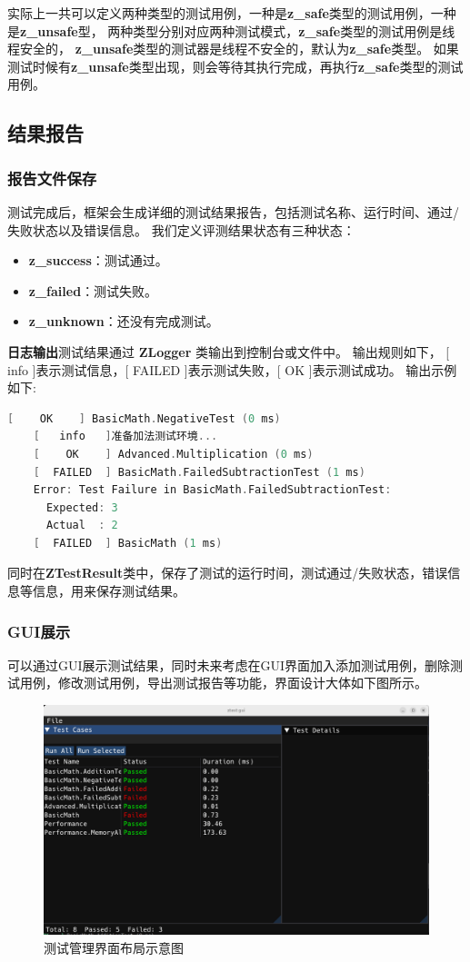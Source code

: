 \documentclass[chinese]{article}
\begin{document}
实际上一共可以定义两种类型的测试用例，一种是\textbf{z\_safe}类型的测试用例，一种是\textbf{z\_unsafe}型，
两种类型分别对应两种测试模式，\textbf{z\_safe}类型的测试用例是线程安全的，
\textbf{z\_unsafe}类型的测试器是线程不安全的，默认为\textbf{z\_safe}类型。
如果测试时候有\textbf{z\_unsafe}类型出现，则会等待其执行完成，再执行\textbf{z\_safe}类型的测试用例。

\subsection{结果报告}
\subsubsection{报告文件保存}
测试完成后，框架会生成详细的测试结果报告，包括测试名称、运行时间、通过/失败状态以及错误信息。
我们定义评测结果状态有三种状态：
\begin{itemize}
    \item \textbf{z\_success}：测试通过。
    \item \textbf{z\_failed}：测试失败。
    \item \textbf{z\_unknown}：还没有完成测试。
\end{itemize}
\textbf{日志输出}测试结果通过 \textbf{ZLogger} 类输出到控制台或文件中。
输出规则如下，
[   info   ]表示测试信息，[   FAILED  ]表示测试失败，[   OK   ]表示测试成功。
输出示例如下:
\begin{lstlisting}[language=C++]
    [    OK    ] BasicMath.NegativeTest (0 ms)
    [   info   ]准备加法测试环境...
    [    OK    ] Advanced.Multiplication (0 ms)
    [  FAILED  ] BasicMath.FailedSubtractionTest (1 ms)
    Error: Test Failure in BasicMath.FailedSubtractionTest:
      Expected: 3
      Actual  : 2
    [  FAILED  ] BasicMath (1 ms)
\end{lstlisting}
同时在\textbf{ZTestResult}类中，保存了测试的运行时间，测试通过/失败状态，错误信息等信息，用来保存测试结果。
\newpage
\subsubsection{GUI展示}
可以通过GUI展示测试结果，同时未来考虑在GUI界面加入添加测试用例，删除测试用例，修改测试用例，导出测试报告等功能，界面设计大体如下图所示。
\begin{figure}[H]
    \centering
    \includegraphics[width=\textwidth]{img/gui.png}
    \caption{测试管理界面布局示意图}
    \label{fig:gui}
    \small
\end{figure}
\end{document}
